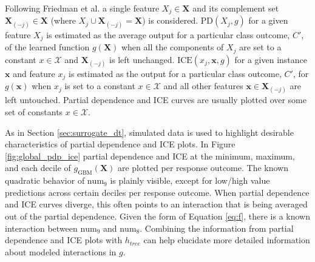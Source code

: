 \documentclass{article}
\begin{document}
Following Friedman et al. a single feature $X_j \in \mathbf{X}$ and its complement set $\mathbf{X}_{(-j)} \in \mathbf{X}$ (where $X_j \cup \mathbf{X}_{(-j)} = \mathbf{X}$) is considered. $\text{PD}(X_j, g)$ for a given feature $X_j$ is estimated as the average output for a particular class outcome, $C'$, of the learned function $g(\mathbf{X})$ when all the components of $X_j$ are set to a constant $x \in \mathcal{X}$ and $\mathbf{X}_{(-j)}$ is left unchanged. $\text{ICE}(x_j, \mathbf{x}, g)$ for a given instance $\mathbf{x}$ and feature $x_j$ is estimated as the output for a particular class outcome, $C'$, for $g(\mathbf{x})$ when $x_j$ is set to a constant $x \in \mathcal{X}$ and all other features $\mathbf{x} \in \mathbf{X}_{(-j)}$ are left untouched. Partial dependence and ICE curves are usually plotted over some set of constants $x \in \mathcal{X}$. 

As in Section \ref{sec:surrogate_dt}, simulated data is used to highlight desirable characteristics of partial dependence and ICE plots. In Figure \ref{fig:global_pdp_ice} partial dependence and ICE at the minimum, maximum, and each decile of $g_{\text{GBM}}(\mathbf{X})$ are plotted per response outcome. The known quadratic behavior of $\text{num}_9$ is plainly visible, except for low/high value predictions across certain deciles per response outcome. When partial dependence and ICE curves diverge, this often points to an interaction that is being averaged out of the partial dependence. Given the form of Equation \ref{eq:f}, there is a known interaction between $\text{num}_9$ and $\text{num}_8$. Combining the information from partial dependence and ICE plots with $h_{tree}$ can help elucidate more detailed information about modeled interactions in $g$.
\end{document}
